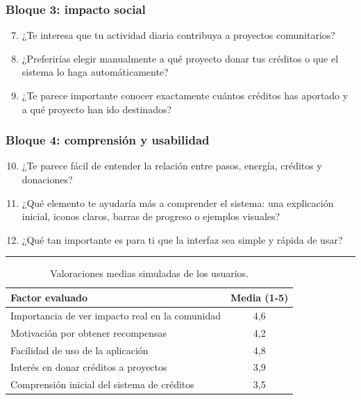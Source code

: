 \documentclass[12pt, a4paper]{article}
\begin{document}
\subsubsection{Bloque 3: impacto social}

\begin{enumerate}[label=\arabic*.]
    \setcounter{enumi}{6}
    \item ¿Te interesa que tu actividad diaria contribuya a proyectos comunitarios?
    \item ¿Preferirías elegir manualmente a qué proyecto donar tus créditos o que el sistema lo haga automáticamente?
    \item ¿Te parece importante conocer exactamente cuántos créditos has aportado y a qué proyecto han ido destinados?
\end{enumerate}

\subsubsection{Bloque 4: comprensión y usabilidad}

\begin{enumerate}[label=\arabic*.]
    \setcounter{enumi}{9}
    \item ¿Te parece fácil de entender la relación entre pasos, energía, créditos y donaciones?
    \item ¿Qué elemento te ayudaría más a comprender el sistema: una explicación inicial, iconos claros, barras de progreso o ejemplos visuales?
    \item ¿Qué tan importante es para ti que la interfaz sea simple y rápida de usar?
\end{enumerate}


\vspace{0.3cm}
\noindent\textcolor{nativoPrimary}{\rule{\linewidth}{1.5pt}}
\vspace{0.3cm}

\begin{table}[h!]
\centering
\begin{tabular}{p{8cm}c}
\toprule
\textbf{Factor evaluado} & \textbf{Media (1-5)} \\
\midrule
Importancia de ver impacto real en la comunidad & 4,6 \\
Motivación por obtener recompensas & 4,2 \\
Facilidad de uso de la aplicación & 4,8 \\
Interés en donar créditos a proyectos & 3,9 \\
Comprensión inicial del sistema de créditos & 3,5 \\
\bottomrule
\end{tabular}
\caption{Valoraciones medias simuladas de los usuarios.}
\end{table}
\end{document}
